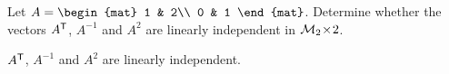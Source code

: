 
\begin{Exercise}[
name={},
title={}, 
difficulty=0,
origin={\cite{BS}}]
Let $A=\begin{mat}
1 & 2\\
0 & 1
\end{mat}$.
Determine whether the vectors ${{A}^{\mathsf{T}}}$, $A^{-1}$ and $A^2$ are linearly independent in $\mathcal{M}_2 \! \times \! 2$.
\end{Exercise}

\begin{Answer}
${{A}^{\mathsf{T}}}$, $A^{-1}$ and $A^2$ are linearly independent.
\end{Answer}
